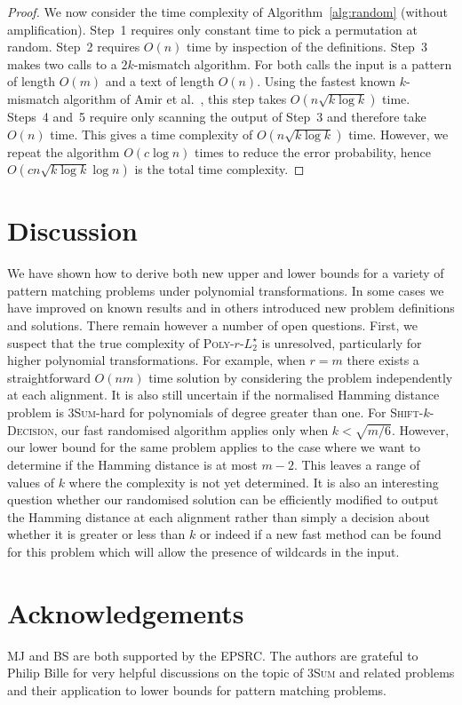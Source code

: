 \documentclass[11pt]{article}
\newcommand{\wildcard}{\ensuremath{\star}\xspace}
\newcommand{\LpolyWild}{\textsc{Poly-$r$-$L_2^\wildcard$}\xspace}
\newcommand{\skDecision}{\textsc{Shift-$k$-Decision}\xspace}
\newcommand{\threeSUM}{\textsc{3Sum}\xspace}
\theoremstyle{plain}
\theoremstyle{definition}
\begin{document}
\begin{proof}
    We now consider the time complexity of Algorithm~\ref{alg:random} (without amplification). Step~1 requires only constant time to pick a permutation at random. Step~2 requires $O(n)$ time by inspection of the definitions. Step~3 makes two calls to a $2k$-mismatch algorithm. For both calls the input is a pattern of length $O(m)$ and a text of length $O(n)$. Using the fastest known $k$-mismatch algorithm of Amir et al.~\cite{ALP:2004}, this step takes $O(n \sqrt{k \log k})$ time. Steps~4 and~5 require only scanning the output of Step~3 and therefore take $O(n)$ time. This gives a time complexity of $O(n \sqrt{k \log k})$ time. However, we repeat the algorithm $O(c\log n)$ times to reduce the error probability, hence $O(cn \sqrt{k \log k}\log n)$ is the total time complexity.
\end{proof}


\section{Discussion}\label{sec:discussion}

We have shown how to derive both new upper and lower bounds for a variety of pattern matching problems under polynomial transformations. In some cases we have improved on known results and in others introduced new problem definitions and solutions.  There remain however a number of open questions. First, we suspect that the true complexity of \LpolyWild is unresolved, particularly for higher polynomial transformations. For example, when $r=m$ there exists a straightforward $O(nm)$ time solution by considering the problem independently at each alignment.  It is also still uncertain if the normalised Hamming distance problem is \threeSUM-hard for polynomials of degree greater than one. For \skDecision, our fast randomised algorithm applies only when $k < \sqrt{m/6}$. However, our lower bound for the same problem applies to the case where we want to determine if the Hamming distance is at most $m-2$. This leaves a range of values of $k$ where the complexity is not yet determined.  It is also an interesting question whether our randomised solution can be efficiently modified to output the Hamming distance at each alignment rather than simply a decision about whether it is greater or less than $k$ or indeed if a new fast method can be found for this problem which will allow the presence of wildcards in the input.

\section{Acknowledgements}
MJ and BS are both supported by the EPSRC. The authors are grateful to Philip Bille for very helpful discussions on the topic of \threeSUM and related problems and their application to lower bounds for pattern matching problems.

\printbibliography
\end{document}
